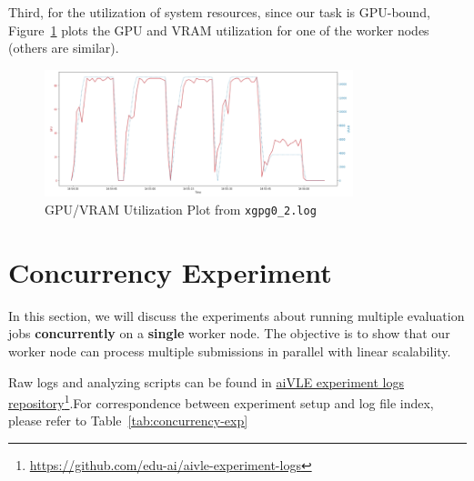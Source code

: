 Third, for the utilization of system resources, since our task is GPU-bound, Figure~\ref{fig:experiment-lb-utilization-plot} plots the GPU and VRAM utilization for one of the worker nodes (others are similar).

\begin{figure}[H]
    \centering
    \includegraphics[width=0.8\textwidth]{images/experiment-lb-utilization-plot.png}
    \caption{GPU/VRAM Utilization Plot from \texttt{xgpg0\_2.log}}
    \label{fig:experiment-lb-utilization-plot}
\end{figure}

\section{Concurrency Experiment}
\label{s:concurrency-exp}
In this section, we will discuss the experiments about running multiple evaluation jobs \textbf{concurrently} on a \textbf{single} worker node. The objective is to show that our worker node can process multiple submissions in parallel with linear scalability.

Raw logs and analyzing scripts can be found in \href{https://github.com/edu-ai/aivle-experiment-logs}{aiVLE experiment logs repository}\footnote{\href{https://github.com/edu-ai/aivle-experiment-logs}{https://github.com/edu-ai/aivle-experiment-logs}}.For correspondence between experiment setup and log file index, please refer to Table~\ref{tab:concurrency-exp}

